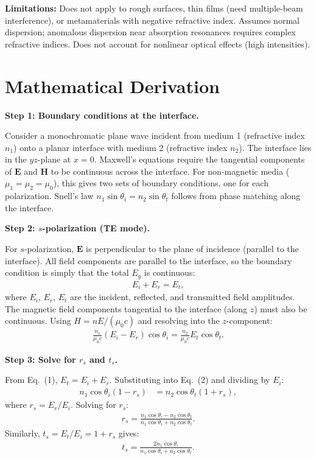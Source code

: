 \textbf{Limitations:} Does not apply to rough surfaces, thin films (need multiple-beam interference), or metamaterials with negative refractive index. Assumes normal dispersion; anomalous dispersion near absorption resonances requires complex refractive indices. Does not account for nonlinear optical effects (high intensities).


\section*{Mathematical Derivation}

\textbf{Step 1: Boundary conditions at the interface.}

Consider a monochromatic plane wave incident from medium 1 (refractive index $n_1$) onto a planar interface with medium 2 (refractive index $n_2$). The interface lies in the $yz$-plane at $x = 0$. Maxwell's equations require the tangential components of $\mathbf{E}$ and $\mathbf{H}$ to be continuous across the interface. For non-magnetic media ($\mu_1 = \mu_2 = \mu_0$), this gives two sets of boundary conditions, one for each polarization. Snell's law $n_1\sin\theta_i = n_2\sin\theta_t$ follows from phase matching along the interface.

\textbf{Step 2: $s$-polarization (TE mode).}

For $s$-polarization, $\mathbf{E}$ is perpendicular to the plane of incidence (parallel to the interface). All field components are parallel to the interface, so the boundary condition is simply that the total $E_y$ is continuous:
\begin{align}
E_i + E_r = E_t, \tag{1}
\end{align}
where $E_i$, $E_r$, $E_t$ are the incident, reflected, and transmitted field amplitudes. The magnetic field components tangential to the interface (along $z$) must also be continuous. Using $H = nE/(\mu_0 c)$ and resolving into the $z$-component:
\begin{align}
\frac{n_1}{\mu_0 c}(E_i - E_r)\cos\theta_i = \frac{n_2}{\mu_0 c}E_t\cos\theta_t. \tag{2}
\end{align}

\textbf{Step 3: Solve for $r_s$ and $t_s$.}

From Eq.\ (1), $E_t = E_i + E_r$. Substituting into Eq.\ (2) and dividing by $E_i$:
\begin{align}
n_1\cos\theta_i(1 - r_s) &= n_2\cos\theta_t(1 + r_s),
\end{align}
where $r_s = E_r/E_i$. Solving for $r_s$:
\begin{align}
r_s = \frac{n_1\cos\theta_i - n_2\cos\theta_t}{n_1\cos\theta_i + n_2\cos\theta_t}.
\end{align}
Similarly, $t_s = E_t/E_i = 1 + r_s$ gives:
\begin{align}
t_s = \frac{2n_1\cos\theta_i}{n_1\cos\theta_i + n_2\cos\theta_t}.
\end{align}

